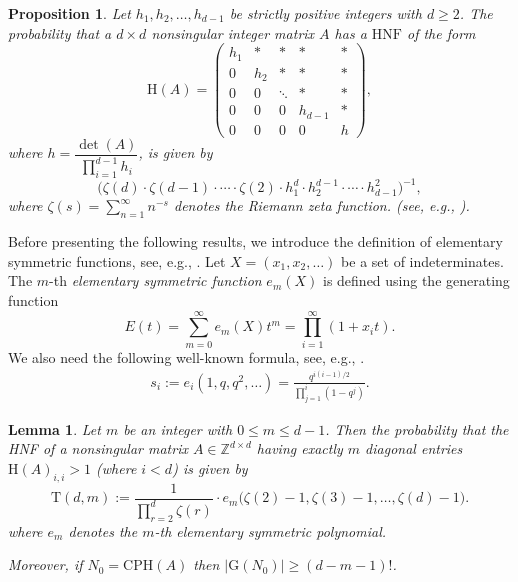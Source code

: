 \documentclass[reqno, 12pt]{article}
\newtheorem{lem}[thm]{Lemma}
\newtheorem{prop}[thm]{Proposition}
\theoremstyle{mydefinition}
\theoremstyle{myremark}
\numberwithin{algorithm}{section}
\newcommand{\h}{{\mathrm{H}}}
\begin{document}
\begin{prop}{\em \cite{MAZE20112398}}\label{Lemm-Probablility-HNF}
Let $h_1, h_2, \dots, h_{d-1}$ be strictly positive integers with $d \geq 2$.
The probability that a $d \times d$ nonsingular integer matrix $A$ has a  $\mathrm{HNF}$ of the form
\[
\h(A) =
\begin{pmatrix}
h_1 & * & * & * & * \\
0 & h_2 & * & * & * \\
0 & 0 & \ddots & * & * \\
0 & 0 & 0 & h_{d-1} & * \\
0 & 0 & 0 & 0 & h
\end{pmatrix},
\]
where \( h = \dfrac{\det(A)}{\prod_{i=1}^{d-1} h_i} \), is given by
\[
\bigl(\zeta(d) \cdot \zeta(d-1) \cdot \cdots \cdot \zeta(2) \cdot h_1^d \cdot h_2^{d-1} \cdot \cdots \cdot h_{d-1}^2\bigr)^{-1},
\]
where \(\zeta(s) = \sum_{n=1}^\infty n^{-s}\)  denotes the Riemann zeta function. (see, e.g.,  \cite{Zeta-Value}).
\end{prop}

Before presenting the following results, we introduce the definition of elementary symmetric functions, see, e.g., \cite[Chapter 7]{RP.Stanley2024}.
Let $X=(x_1,x_2,\ldots)$ be a set of indeterminates.
The $m$-th \emph{elementary symmetric function} $e_m(X)$ is defined using the generating function
$$E(t)=\sum_{m=0}^{\infty} e_m(X)t^m=\prod_{i=1}^{\infty}(1+x_i t).$$
We also need the following well-known formula, see, e.g., \cite[Proposition 7.8.3]{RP.Stanley2024}.
\begin{align}\label{e-si}
s_i :=e_i(1,q,q^2,\dots) = \frac{q^{i(i-1)/2}}{\prod_{j=1}^{i}(1-q^j)}.
\end{align}



\begin{lem}\label{lem-indicator-probability}
Let $m$ be an integer with $0\leq m \leq d-1$. Then the probability that the \emph{HNF} of a nonsingular matrix $A \in \mathbb{Z}^{d \times d}$ having exactly $m$ diagonal entries $\h(A)_{i,i}>1$ (where $i<d$)
is given by
\[
\mathrm{T}(d,m):= \frac{1}{\prod_{r=2}^d \zeta(r)} \cdot e_m\!\bigl(\zeta(2)-1,\zeta(3)-1,\ldots,\zeta(d)-1\bigr).
\]
where $e_m$ denotes the $m$-th elementary symmetric polynomial.

Moreover, if $N_0 = \mathrm{CPH}(A)$ then $|\mathrm{G}(N_0)| \ge (d - m - 1)!$.
\end{lem}
\end{document}
